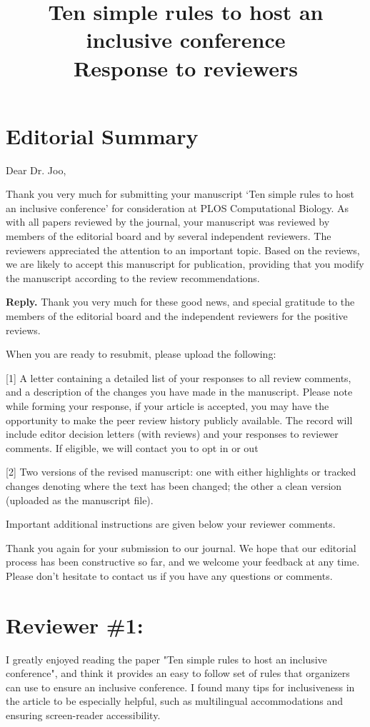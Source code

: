 \documentclass{article}
\title{Ten simple rules to host an inclusive conference\\ \vspace{0.5cm}
\textbf{Response to reviewers}}
\author{}
\date{}
\newenvironment{Reply}{\noindent\color{BlueViolet}\textbf{Reply.}}{\vspace{1em}}
\begin{document}
\maketitle

\section*{Editorial Summary} 

Dear Dr. Joo,

Thank you very much for submitting your manuscript `Ten simple rules to host an inclusive conference' for consideration at PLOS Computational Biology. As with all papers reviewed by the journal, your manuscript was reviewed by members of the editorial board and by several independent reviewers. The reviewers appreciated the attention to an important topic. Based on the reviews, we are likely to accept this manuscript for publication, providing that you modify the manuscript according to the review recommendations.

\begin{Reply}
    Thank you very much for these good news, and special gratitude to the members of the editorial board and the independent reviewers for the positive reviews.
\end{Reply}

When you are ready to resubmit, please upload the following:


[1] A letter containing a detailed list of your responses to all review comments, and a description of the changes you have made in the manuscript. Please note while forming your response, if your article is accepted, you may have the opportunity to make the peer review history publicly available. The record will include editor decision letters (with reviews) and your responses to reviewer comments. If eligible, we will contact you to opt in or out

[2] Two versions of the revised manuscript: one with either highlights or tracked changes denoting where the text has been changed; the other a clean version (uploaded as the manuscript file).

Important additional instructions are given below your reviewer comments.

 Thank you again for your submission to our journal. We hope that our editorial process has been constructive so far, and we welcome your feedback at any time. Please don't hesitate to contact us if you have any questions or comments.


\section*{Reviewer \#1:}
I greatly enjoyed reading the paper "Ten simple rules to host an inclusive conference", and think it provides an easy to follow set of rules that organizers can use to ensure an inclusive conference. I found many tips for inclusiveness in the article to be especially helpful, such as multilingual accommodations and ensuring screen-reader accessibility.
\end{document}
